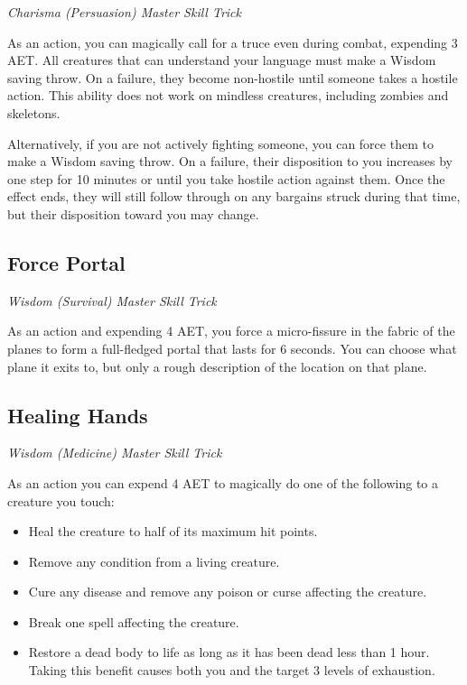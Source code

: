 \textit{Charisma (Persuasion) Master Skill Trick}

As an action, you can magically call for a truce even during combat, expending 3 AET. All creatures that can understand your language must make a Wisdom saving throw. On a failure, they become non-hostile until someone takes a hostile action. This ability does not work on mindless creatures, including zombies and skeletons.

Alternatively, if you are not actively fighting someone, you can force them to make a Wisdom saving throw. On a failure, their disposition to you increases by one step for 10 minutes or until you take hostile action against them. Once the effect ends, they will still follow through on any bargains struck during that time, but their disposition toward you may change.

\subsection{Force Portal}

\textit{Wisdom (Survival) Master Skill Trick}

As an action and expending 4 AET, you force a micro-fissure in the fabric of the planes to form a full-fledged portal that lasts for 6 seconds. You can choose what plane it exits to, but only a rough description of the location on that plane.

\subsection{Healing Hands}

\textit{Wisdom (Medicine) Master Skill Trick}

As an action you can expend 4 AET to magically do one of the following to a creature you touch:
\begin{itemize}
	\item Heal the creature to half of its maximum hit points.
	\item Remove any condition from a living creature.
	\item Cure any disease and remove any poison or curse affecting the creature.
	\item Break one spell affecting the creature.
	\item Restore a dead body to life as long as it has been dead less than 1 hour. Taking this benefit causes both you and the target 3 levels of exhaustion.
\end{itemize}